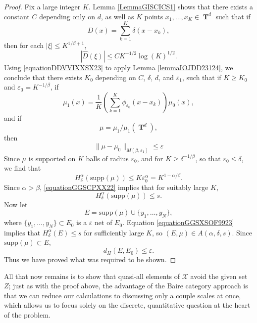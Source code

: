 \documentclass[12pt,reqno]{article}
\numberwithin{equation}{section}
\DeclareMathOperator{\TT}{\mathbf{T}}
\begin{document}
\begin{proof}
    Fix a large integer $K$. Lemma \ref{LemmaGISCICS1} shows that there exists a constant $C$ depending only on $d$, as well as $K$ points $x_1, \dots, x_K \in \TT^d$ such that if
    \[ D(x) = \sum_{k = 1}^K \delta(x - x_k), \]
    then for each $|\xi| \leq K^{1/\beta + 1}$,
    \begin{equation} \label{equationDDVVIXXSX23}
        |\widehat{D}(\xi)| \leq C K^{-1/2} \log(K)^{1/2}.
    \end{equation}
    Using \eqref{equationDDVVIXXSX23} to apply Lemma \ref{lemmaIOJDD23124}, we conclude that there exists $K_0$ depending on $C$, $\delta$, $d$, and $\varepsilon_1$, such that if $K \geq K_0$ and $\varepsilon_0 = K^{-1/\beta}$, if
    \[ \mu_1(x) = \frac{1}{K} \left( \sum_{k = 1}^K \phi_{\varepsilon_0}(x - x_k) \right) \mu_0(x), \]
    and if
    \[ \mu = \mu_1 / \mu_1(\TT^d), \]
    then
    \begin{equation} \label{equationYYUDUSC4434}
        \| \mu - \mu_0 \|_{M(\beta,\varepsilon_1)} \leq \varepsilon
    \end{equation}
    Since $\mu$ is supported on $K$ balls of radius $\varepsilon_0$, and for $K \geq \delta^{-1/\beta}$, so that $\varepsilon_0 \leq \delta$, we find that
    \begin{equation} \label{equationGGSCPXX22}
        H^\alpha_\delta(\text{supp}(\mu)) \leq K \varepsilon_0^\alpha = K^{1 - \alpha/\beta}.
    \end{equation}
    Since $\alpha > \beta$, \eqref{equationGGSCPXX22} implies that for suitably large $K$,
    \begin{equation} \label{equationGGSXSOF9923}
        H^\alpha_\delta(\text{supp}(\mu)) \leq s.
    \end{equation}
    Now let
    \[ E = \text{supp}(\mu) \cup \{ y_1, \dots, y_N \}, \]
    where $\{ y_1, \dots, y_N \} \subset E_0$ is a $\varepsilon$ net of $E_0$. Equation \eqref{equationGGSXSOF9923} implies that $H^\alpha_\delta(E) \leq s$ for sufficiently large $K$, so $(E,\mu) \in A(\alpha,\delta,s)$. Since $\text{supp}(\mu) \subset E$,
    \begin{equation} \label{equationGGISIICV222}
        d_H(E,E_0) \leq \varepsilon.
    \end{equation}
    Thus we have proved what was required to be shown.
\end{proof}

All that now remains is to show that quasi-all elements of $\mathcal{X}$ avoid the given set $Z$; just as with the proof above, the advantage of the Baire category approach is that we can reduce our calculations to discussing only a couple scales at once, which allows us to focus solely on the discrete, quantitative question at the heart of the problem.
\end{document}
